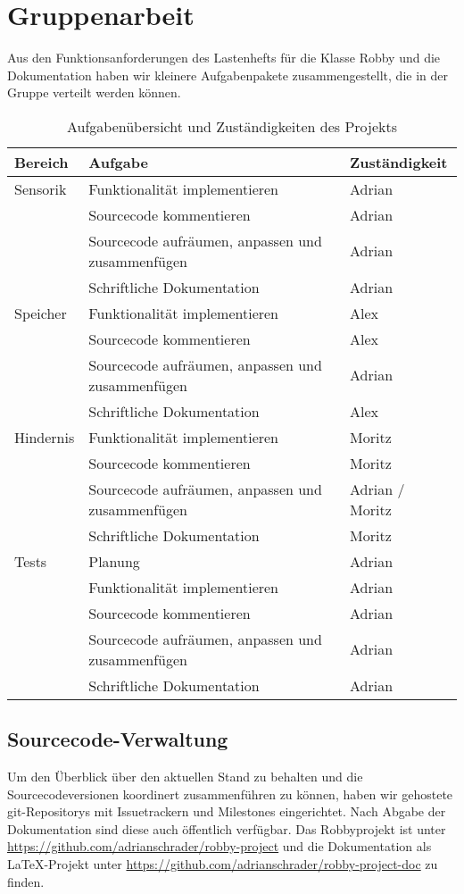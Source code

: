 \section{Gruppenarbeit}
Aus den Funktionsanforderungen des Lastenhefts für die Klasse Robby und die Dokumentation haben wir kleinere Aufgabenpakete zusammengestellt, die in der Gruppe verteilt werden können.

\begin{table*}
    \centering
    \caption{Aufgabenübersicht und Zuständigkeiten des Projekts}
    \begin{tabular}{ l l l }
        \textbf{Bereich} & \textbf{Aufgabe} & \textbf{Zuständigkeit}\\ \hline\hline
        Sensorik & Funktionalität implementieren & Adrian \\
                 & Sourcecode kommentieren & Adrian \\
                 & Sourcecode aufräumen, anpassen und zusammenfügen & Adrian \\
                 & Schriftliche Dokumentation & Adrian \\ \hline
        Speicher & Funktionalität implementieren & Alex \\
                 & Sourcecode kommentieren & Alex \\
                 & Sourcecode aufräumen, anpassen und zusammenfügen & Adrian \\
                 & Schriftliche Dokumentation & Alex \\ \hline
       Hindernis & Funktionalität implementieren & Moritz \\
                 & Sourcecode kommentieren & Moritz \\
                 & Sourcecode aufräumen, anpassen und zusammenfügen & Adrian / Moritz \\
                 & Schriftliche Dokumentation & Moritz \\ \hline
        Tests    & Planung & Adrian \\
                 & Funktionalität implementieren & Adrian \\
                 & Sourcecode kommentieren & Adrian \\
                 & Sourcecode aufräumen, anpassen und zusammenfügen & Adrian \\
                 & Schriftliche Dokumentation & Adrian \\ \hline
    \end{tabular}
\end{table*}

\newpage
\subsection*{Sourcecode-Verwaltung}
Um den Überblick über den aktuellen Stand zu behalten und die Sourcecodeversionen koordinert zusammenführen zu können, haben wir gehostete git-Repositorys mit Issuetrackern und Milestones eingerichtet. Nach Abgabe der Dokumentation sind diese auch öffentlich verfügbar. Das Robbyprojekt ist unter \url{https://github.com/adrianschrader/robby-project} und die Dokumentation als \LaTeX-Projekt unter \url{https://github.com/adrianschrader/robby-project-doc} zu finden.
